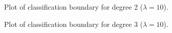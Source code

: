 \documentclass{article}
\begin{document}
\begin{itemize}
    \begin{figure}[H]
 \caption{Plot of classification boundary for degree 2 ($\lambda=10$).}
 \label{fig:13}
 \end{figure}
     \begin{figure}[H]
 \caption{Plot of classification boundary for degree 3 ($\lambda=10$).}
 \label{fig:14}
 \end{figure}
\end{itemize}
\end{document}
